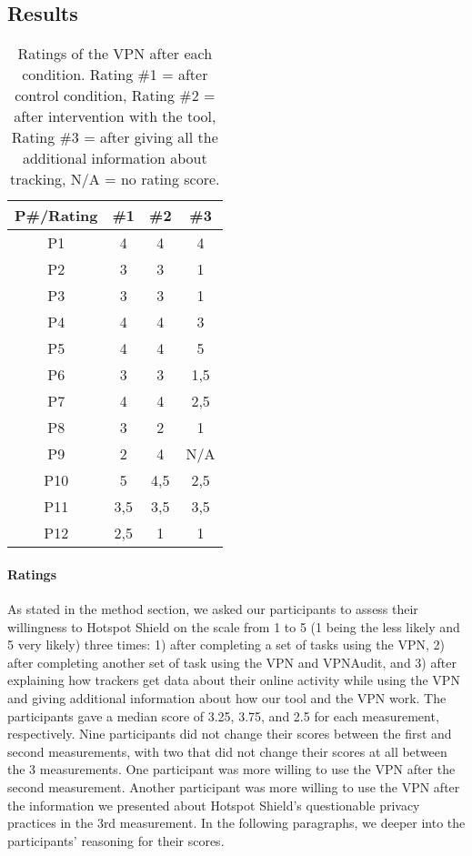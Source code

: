 \subsection{Results}\label{sec:results}

\begin{table}[h!]
\centering
\begin{tabular}{|c c c c|} 
 \hline
P\#/Rating & \#1 & \#2 & \#3 \\
\hline
P1 & 4 & 4 & 4\\
P2 & 3 & 3 & 1\\
P3 & 3 & 3 & 1\\
P4 & 4 & 4 & 3\\
P5 & 4 & 4 & 5\\
P6 & 3 & 3 & 1,5\\
P7 & 4 & 4 & 2,5\\
P8 & 3 & 2 & 1\\
P9 & 2 & 4 & N/A\\
P10 & 5 & 4,5 & 2,5\\
P11 & 3,5 & 3,5 & 3,5\\
P12 & 2,5 & 1 & 1 \\
 \hline
\end{tabular}
\caption{Ratings of the VPN after each condition. Rating \#1 = after control condition, Rating \#2 = after intervention with the tool, Rating \#3 = after giving all the additional information about tracking, N/A = no rating score.}
\label{table:2}
\end{table}

\paragraph{Ratings}

As stated in the method section, we asked our participants to assess their
willingness to Hotspot Shield on the scale from 1 to 5 (1 being the less likely
and 5 very likely) three times: 1) after completing a set of tasks using the
VPN, 2) after completing another set of task using the VPN and VPNAudit, and
3) after explaining how trackers get data about their online activity
while using the VPN and giving additional information about how our tool and the VPN work.  The participants gave a median score of 3.25, 3.75, and 2.5 for each measurement, respectively. Nine participants did not change their scores between the
first and second measurements, with two that did not change their scores at
all between the 3 measurements. One participant was more willing to use the
VPN after the second measurement. Another participant was more willing to
use the VPN after the information we presented about Hotspot Shield's questionable privacy practices in the 3rd measurement.  In the following paragraphs, we deeper into the participants' reasoning for their scores.

